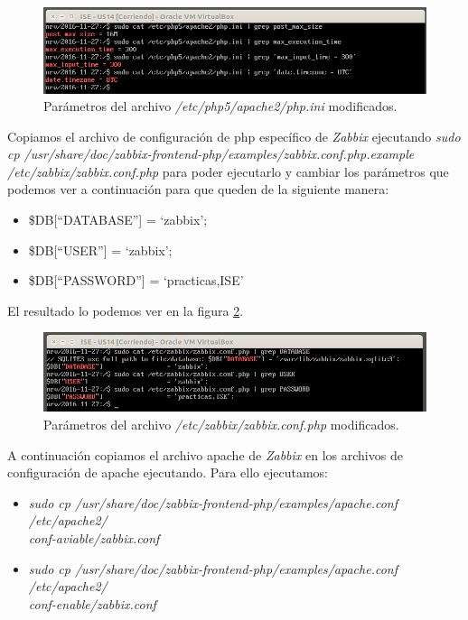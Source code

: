 \documentclass[a4paper,titlepage,12pt]{scrartcl}	%
\numberwithin{figure}{section} %
\numberwithin{table}{section} %
\begin{document}
	\begin{figure}[H]
		\includegraphics[width=\linewidth]{./Imagenes/O4-7.png}
		\vspace{-0.5cm}
		\caption[Parámetros del archivo \textit{/etc/php5/apache2/php.ini} modificados.]{Parámetros del archivo \textit{/etc/php5/apache2/php.ini} modificados.}
		\label{O4-7}
	\end{figure}
	
	Copiamos el archivo de configuración de php específico de \textit{Zabbix} ejecutando \textit{sudo cp /usr/share/doc/zabbix-frontend-php/examples/zabbix.conf.php.example /etc/zabbix/zabbix.conf.php} para poder ejecutarlo y cambiar los parámetros que podemos ver a continuación para que queden de la siguiente manera:
	\begin{itemize}
		\item \$DB[``DATABASE''] = `zabbix';
		\item \$DB[``USER''] = `zabbix';
		\item \$DB[``PASSWORD''] = `practicas,ISE'
	\end{itemize}
	
	El resultado lo podemos ver en la figura \ref{O4-8}.
	
	\begin{figure}[H]
		\includegraphics[width=\linewidth]{./Imagenes/O4-8.png}
		\vspace{-0.5cm}
		\caption[Parámetros del archivo \textit{/etc/zabbix/zabbix.conf.php} modificados.]{Parámetros del archivo \textit{/etc/zabbix/zabbix.conf.php} modificados.}
		\label{O4-8}
	\end{figure}
	
	A continuación copiamos el archivo apache de \textit{Zabbix} en los archivos de configuración de apache ejecutando. Para ello ejecutamos:
	\begin{itemize}
		\item \textit{sudo cp /usr/share/doc/zabbix-frontend-php/examples/apache.conf /etc/apache2/\\conf-aviable/zabbix.conf}
		\item \textit{sudo cp /usr/share/doc/zabbix-frontend-php/examples/apache.conf /etc/apache2/\\conf-enable/zabbix.conf}
	\end{itemize}
	
\end{document}

